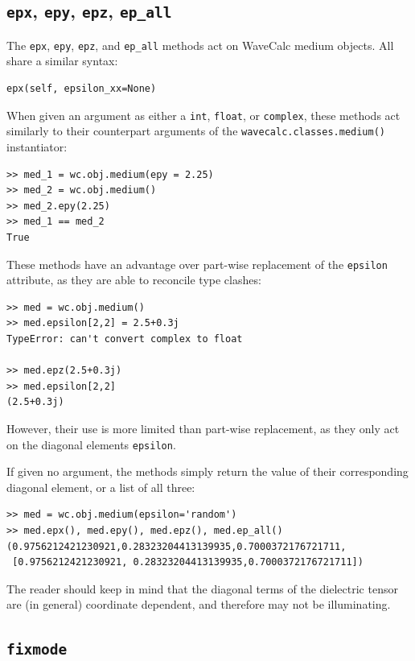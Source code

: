 \documentclass[11pt, reqno]{book}%
\newcounter{ct}
\newcommand{\tw}[1]{{\tt #1}}
\begin{document}
\subsection{\tw{epx}, \tw{epy}, \tw{epz}, \tw{ep\_all}}
\label{sec:epmethod}

The \tw{epx}, \tw{epy}, \tw{epz}, and \tw{ep\_all} methods act on WaveCalc medium objects. All share a similar syntax:
\begin{verbatim}
epx(self, epsilon_xx=None)
\end{verbatim}
\noindent When given an argument as either a \tw{int}, \tw{float}, or \tw{complex}, these methods act similarly to their counterpart arguments of the \tw{wavecalc.classes.medium()} instantiator:
\begin{verbatim}
>> med_1 = wc.obj.medium(epy = 2.25)
>> med_2 = wc.obj.medium()
>> med_2.epy(2.25)
>> med_1 == med_2
True
\end{verbatim}
\noindent These methods have an advantage over part-wise replacement of the \tw{epsilon} attribute, as they are able to reconcile type clashes:
\begin{verbatim}
>> med = wc.obj.medium()
>> med.epsilon[2,2] = 2.5+0.3j
TypeError: can't convert complex to float

>> med.epz(2.5+0.3j)
>> med.epsilon[2,2]
(2.5+0.3j)
\end{verbatim}
\noindent However, their use is more limited than part-wise replacement, as they only act on the diagonal elements \tw{epsilon}.

If given no argument, the methods simply return the value of their corresponding diagonal element, or a list of all three:
\begin{verbatim}
>> med = wc.obj.medium(epsilon='random')
>> med.epx(), med.epy(), med.epz(), med.ep_all()
(0.9756212421230921,0.28323204413139935,0.7000372176721711,
 [0.9756212421230921, 0.28323204413139935,0.7000372176721711])
\end{verbatim}
\noindent The reader should keep in mind that the diagonal terms of the dielectric tensor are (in general) coordinate dependent, and therefore may not be illuminating.





\subsection{\tw{fixmode}}
\label{sec:fixmodemethod}
\end{document}
